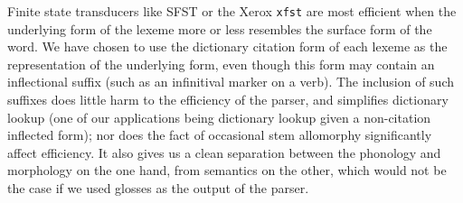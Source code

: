 Finite state transducers like SFST or the Xerox \texttt{xfst} are most efficient when the underlying form of the lexeme more or less resembles the surface form of the word. We have chosen to use the dictionary citation form of each lexeme as the representation of the underlying form, even though this form may contain an inflectional suffix (such as an infinitival marker on a verb). The inclusion of such suffixes does little harm to the efficiency of the parser, and simplifies dictionary lookup (one of our applications being dictionary lookup given a non-citation inflected form); nor does the fact of occasional stem allomorphy significantly affect efficiency. It also gives us a clean separation between the phonology and morphology on the one hand, from semantics on the other, which would not be the case if we used glosses as the output of the parser.

